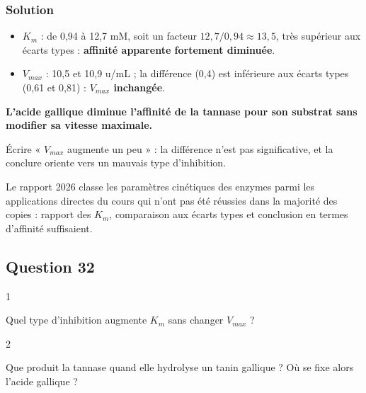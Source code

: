 \documentclass[11pt,a4paper]{article}
\providecommand{\tightlist}{\setlength{\itemsep}{0pt}\setlength{\parskip}{0pt}}
\begin{document}
\hypertarget{solution-31}{%
\subsubsection{Solution}\label{solution-31}}

\begin{itemize}
\tightlist
\item
  \(K_m\) : de 0,94 à 12,7 mM, soit un facteur \(12{,}7/0{,}94 \approx 13{,}5\), très supérieur aux écarts types : \textbf{affinité apparente fortement diminuée}.
\item
  \(V_{max}\) : 10,5 et 10,9 u/mL ; la différence (0,4) est inférieure aux écarts types (0,61 et 0,81) : \textbf{\(V_{max}\) inchangée}.
\end{itemize}

\textbf{L'acide gallique diminue l'affinité de la tannase pour son substrat sans modifier sa vitesse maximale.}

\begin{piege}

Écrire « \(V_{max}\) augmente un peu » : la différence n'est pas significative, et la conclure oriente vers un mauvais type d'inhibition.

\end{piege}

\begin{jury}

Le rapport 2026 classe les paramètres cinétiques des enzymes parmi les applications directes du cours qui n'ont pas été réussies dans la majorité des copies : rapport des \(K_m\), comparaison aux écarts types et conclusion en termes d'affinité suffisaient.

\end{jury}

\hypertarget{question-32}{%
\subsection{Question 32}\label{question-32}}

\begin{indication}{1}

Quel type d'inhibition augmente \(K_m\) sans changer \(V_{max}\) ?

\end{indication}

\begin{indication}{2}

Que produit la tannase quand elle hydrolyse un tanin gallique ? Où se fixe alors l'acide gallique ?

\end{indication}
\end{document}
